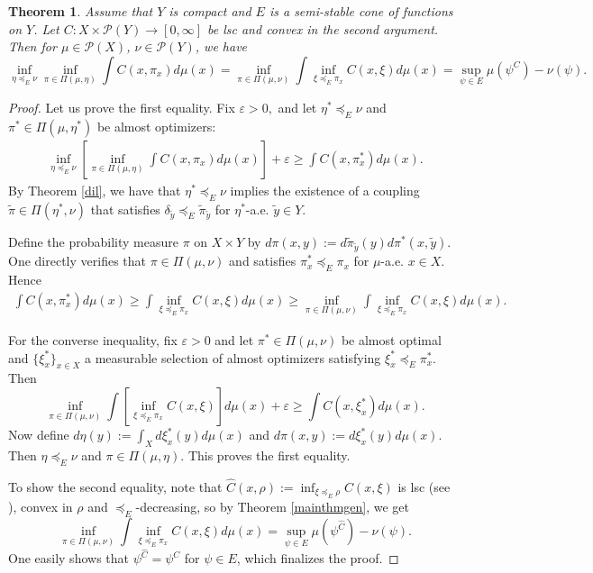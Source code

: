 \documentclass[reqno, a4paper]{amsart}
\newcommand{\ld}{\preceq_{E}}
\newtheorem{theorem}{Theorem}[section]
\newcommand{\PP}{\mathcal{P}}
\theoremstyle{definition}
\theoremstyle{definition}
\theoremstyle{definition}
\begin{document}
\begin{theorem} \label{proj} Assume that $Y$ is compact and $E$ is a semi-stable cone of functions on $Y$. Let $C:X\times\PP(Y)\to[0,\infty]$ be lsc and convex in the second argument. Then for $\mu\in\PP(X)$, $\nu\in \PP(Y)$, we have
    $$\inf_{\eta\ld\nu}  \inf_{\pi\in\Pi(\mu,\eta) }\int C(x,\pi_x)d\mu(x)=\inf_{\pi\in\Pi(\mu,\nu)} \int \inf_{\xi\ld\pi_x}C(x,\xi) d\mu(x)=\sup_{\psi\in E}\mu(\psi^C)-\nu(\psi).$$
\end{theorem}
\begin{proof}
  Let us prove the first equality.  Fix $\varepsilon>0,$ and let $\eta^*\ld\nu$ and $\pi^*\in\Pi(\mu,\eta^*)$ be almost optimizers:
    \begin{align*}
        \inf_{\eta\ld\nu} \left[ \inf_{\pi\in\Pi(\mu,\eta) }\int C(x,\pi_x)d\mu(x)\right]+\varepsilon\geq
          \int C(x,\pi^*_x)d\mu(x).
    \end{align*}
By Theorem \ref{dil}, we have that $\eta^*\ld\nu$ implies the existence of a coupling $\widetilde{\pi}\in \Pi(\eta^*,\nu)$ that satisfies $\delta_{\widetilde{y}}\ld\widetilde{\pi}_{\widetilde{y}}$ for $\eta^*$-a.e. $\widetilde{y}\in Y$.

Define the probability measure $\pi$ on $X\times Y$ by $d\pi(x,y):=d\widetilde{\pi}_{\widetilde{y}}(y) d\pi^*(x,\widetilde{y}).$ One directly verifies that $\pi\in\Pi(\mu,\nu)$ and satisfies $\pi_x^*\ld\pi_x$ for $\mu$-a.e. $x\in X$. Hence
 \begin{align*}
          \int C(x,\pi^*_x)d\mu(x)\geq \int \inf_{\xi\ld\pi_x}C(x,\xi) d\mu(x) \geq \inf_{\pi\in\Pi(\mu,\nu)}\int\inf_{\xi\ld\pi_x}C(x,\xi) d\mu(x) .
    \end{align*}


For the converse inequality, fix $\varepsilon>0$ and let $\pi^*\in\Pi(\mu,\nu)$ be almost optimal and $\{\xi_x^*\}_{x\in X}$ a measurable selection of almost optimizers satisfying $\xi_x^*\ld \pi_x^*$. Then
$$\inf_{\pi\in\Pi(\mu,\nu)} \int \left[\inf_{\xi\ld\pi_x}C(x,\xi)\right] d\mu(x)+\varepsilon \geq \int C(x,\xi_x^*)d\mu(x).$$
Now define $d\eta(y):=\int_X d\xi_x^*(y)d\mu(x)$ and $d\pi(x,y):=d\xi^*_x(y)d\mu(x).$ Then $\eta\ld\nu$ and $\pi\in\Pi(\mu,\eta).$ This proves the first equality. 

To show the second equality, note that $\widehat{C}(x,\rho):=\inf_{\xi\ld\rho} C(x,\xi)$ is lsc (see \cite[Proposition 7.33]{bertsekas1978stochastic}), convex in $\rho$ and $\ld$-decreasing, so by Theorem \ref{mainthmgen}, we get
$$\inf_{\pi\in\Pi(\mu,\nu)} \int \inf_{\xi\ld\pi_x}C(x,\xi) d\mu(x)=\sup_{\psi\in E}\mu(\psi^{\widehat{C}})-\nu(\psi).$$
One easily shows that $\psi^{\widehat{C}}=\psi^C$ for $\psi\in E$, which finalizes the proof.
\end{proof}
\end{document}
